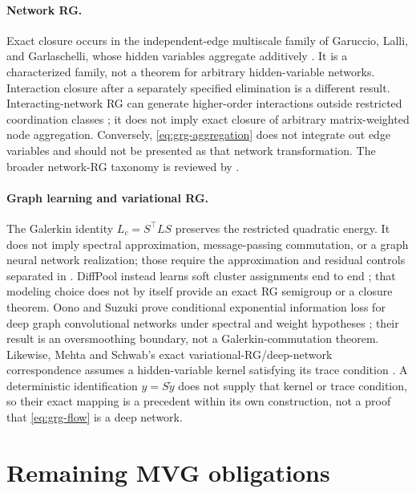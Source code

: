 \paragraph{Network RG.}
Exact closure occurs in the independent-edge multiscale family of Garuccio,
Lalli, and Garlaschelli, whose hidden variables aggregate additively
\citep{Garuccio2023Multiscale}. It is a characterized family, not a theorem
for arbitrary hidden-variable networks. Interaction closure after a
separately specified elimination is a different result. Interacting-network
RG can generate higher-order interactions
outside restricted coordination classes
\citep{CatanzaroGarlaschelliPatil2026}; it does not imply exact closure of
arbitrary matrix-weighted node aggregation.  Conversely,
\eqref{eq:grg-aggregation} does not integrate out edge variables and should
not be presented as that network transformation. The broader network-RG
taxonomy is reviewed by \citet{gabrielli2025network}. 

\paragraph{Graph learning and variational RG.}
The Galerkin identity
\(L_c=S^\top LS\) preserves the restricted quadratic energy.  It does not
imply spectral approximation, message-passing commutation, or a graph neural
network realization; those require the approximation and residual controls
separated in 
\citep{Loukas2019,JolyKeriven2024}. DiffPool instead learns soft cluster
assignments end to end \citep{Ying2018DiffPool}; that modeling choice does
not by itself provide an exact RG semigroup or a closure theorem.
Oono and Suzuki prove conditional exponential information loss for deep
graph convolutional networks under spectral and weight hypotheses
\citep{OonoSuzuki2020}; their result is an oversmoothing boundary, not a
Galerkin-commutation theorem. Likewise,
Mehta and Schwab's exact variational-RG/deep-network correspondence assumes a
hidden-variable kernel satisfying its trace condition
\citep{MehtaSchwab2014}.  A deterministic identification \(y=S\widetilde y\)
does not supply that kernel or trace condition, so their exact mapping is a
precedent within its own construction, not a proof that
\eqref{eq:grg-flow} is a deep network. 

\section{Remaining MVG obligations}
\label{sec:grg-obligations}

